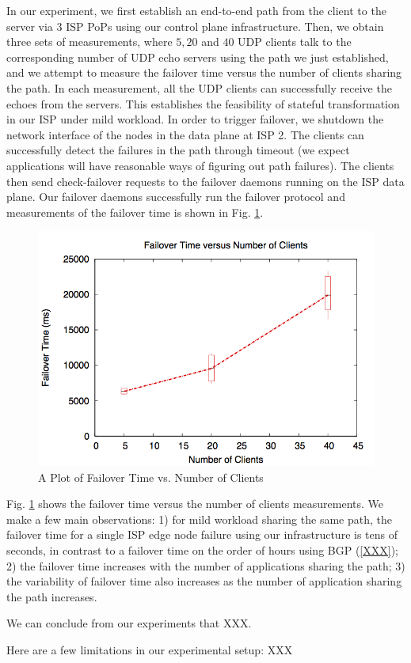 \documentclass{article}
\begin{document}
In our experiment, we first establish an end-to-end path from the client 
to the server via 3 ISP PoPs using our control plane infrastructure.
Then, we obtain three sets of measurements, where
 $5, 20$ and $40$ UDP clients talk to the corresponding
number of UDP echo servers using the path we just established, and
we attempt to measure the failover time versus the number of clients
sharing the path.
In each measurement, all the UDP clients can successfully receive
the echoes from the servers. This establishes the feasibility of
stateful transformation in our ISP under mild workload.
In order to trigger failover, we shutdown the network interface of the 
nodes in the data plane at ISP 2. The clients can successfully detect
the failures in the path through timeout (we expect applications will
have reasonable ways of figuring out path failures). The clients then
send check-failover requests to the failover daemons running on the
ISP data plane. Our failover daemons successfully run the failover
protocol and measurements of the failover time is shown in Fig. \ref{fig:failover}.

\begin{figure}
\includegraphics[width=\linewidth]{failoverTime_numClients}
\caption{A Plot of Failover Time vs. Number of Clients}
\label{fig:failover}
\end{figure}

Fig. \ref{fig:failover} shows the failover time versus the number of clients
measurements. We make a few main observations: 1) for mild workload sharing
the same path, the failover time for a single ISP edge node failure using our infrastructure
is tens of seconds, in contrast to a failover time on the order of hours using BGP (\ref{XXX});
2) the failover time increases with the number of applications sharing the path;
3) the variability of failover time also increases as the number of application sharing the path increases.

We can conclude from our experiments that XXX.

Here are a few limitations in our experimental setup: XXX




\end{document}
